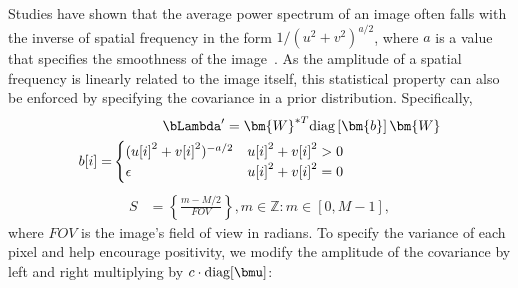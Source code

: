 
Studies have shown that the average power spectrum of an image often falls with the inverse of spatial frequency in the form $1/(u^2 + v^2)^{a/2}$, where $a$ is a value that specifies the smoothness of the image~\cite{torralba2003statistics}. 
As the amplitude of a spatial frequency is linearly related to the image itself, this statistical property can also be enforced by specifying the covariance in a prior distribution. Specifically, 
\begin{align}
& \hspace{.5in} \bLambda'  =    \bm{W}^{*T}  \mbox{diag} \left[ \bm{b}  \right]  \bm{W}  \\ 
b[i] = & \begin{cases} 
({u[i]}^2 + {v[i]}^2)^{-a/2}  & {u[i]}^2 + {v[i]}^2 > 0 \\
\epsilon & {u[i]}^2 + {v[i]}^2  = 0 \\
\end{cases}
\end{align}
\begin{align}
S &= \left\{ \frac{m-M/2}{FOV} \right\}, m\in \mathbb{Z}: m \in [0,M-1],
\end{align}
where $FOV$ is the image's field of view in radians.
To specify the variance of each pixel and help encourage positivity, we modify the amplitude of the covariance by left and right multiplying by ${c \cdot \mbox{diag}[\bmu ]} $:
